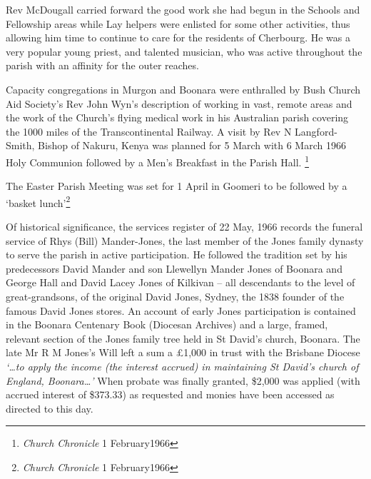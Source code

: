 Rev McDougall carried forward the good work she had begun in the Schools and Fellowship areas while Lay helpers were enlisted for some other activities, thus allowing him time to continue to care for the residents of Cherbourg. He was a very popular young priest, and talented musician, who was active throughout the parish with an affinity for the outer reaches.



Capacity congregations in Murgon and Boonara were enthralled by Bush Church Aid Society's Rev John Wyn's description of working in vast, remote areas and the work of the Church's flying medical work in his Australian parish covering the 1000 miles of the Transcontinental Railway. A visit by Rev N Langford-Smith, Bishop of Nakuru, Kenya was planned for 5 March with 6 March 1966 Holy Communion followed by a Men's Breakfast in the Parish Hall. \footnote{\emph{Church Chronicle} 1 February1966}


The Easter Parish Meeting was set for 1 April in Goomeri to be followed by a `basket lunch'\footnote{\emph{Church Chronicle} 1 February1966}


Of historical significance, the services register of 22 May, 1966 records the funeral service of Rhys (Bill) Mander-Jones, the last member of the Jones family dynasty to serve the parish in active participation. He followed the tradition set by his predecessors David Mander and son Llewellyn Mander Jones of Boonara and George Hall and David Lacey Jones of Kilkivan -- all descendants to the level of great-grandsons, of the original David Jones, Sydney, the 1838 founder of the famous David Jones stores. An account of early Jones participation is contained in the Boonara Centenary Book (Diocesan Archives) and a large, framed, relevant section of the Jones family tree held in St David's church, Boonara. The late Mr R M Jones's Will left a sum a \pounds1,000 in trust with the Brisbane Diocese \emph{`\ldots to apply the income (the interest accrued) in maintaining St David's church of England, Boonara\ldots'} When probate was finally granted, \$2,000 was applied (with accrued interest of \$373.33) as requested and monies have been accessed as directed to this day.









